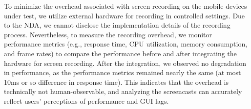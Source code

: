 To minimize the overhead associated with screen recording on the mobile devices under test, we utilize external hardware for recording in controlled settings.
Due to the NDA, we cannot disclose the implementation details of the recording process. 
Nevertheless, to measure the recording overhead, we monitor performance metrics (e.g., response time, CPU utilization, memory consumption, and frame rates) to compare the performance before and after integrating the hardware for screen recording. After the integration, we observed no degradation in performance, as the performance metrics remained nearly the same (at most 10ms or so difference in response time). This indicates that the overhead is technically not human-observable, and analyzing the screencasts can accurately reflect users' perceptions of performance and GUI lags.








